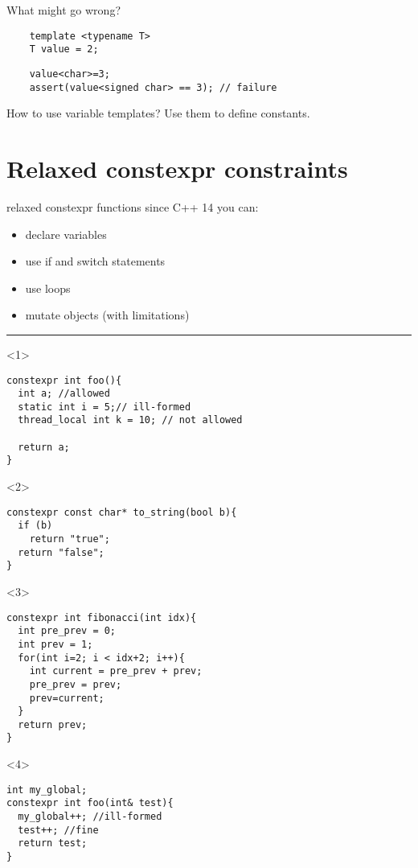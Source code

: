 \documentclass[10pt]{beamer}
\begin{document}
\begin{frame}[fragile]{What might go wrong?}
	\begin{verbatim}
	template <typename T>
	T value = 2;
	\end{verbatim}

	\pause

	\begin{verbatim}
	value<char>=3;
	assert(value<signed char> == 3); // failure
	\end{verbatim}
\end{frame}

\begin{frame}{How to use variable templates?}
\vfill
	\centering \alert{Use them to define constants.}
\vfill
\end{frame}


\section{Relaxed constexpr constraints}
\begin{frame}[fragile]{relaxed constexpr functions}
	since C++ 14 you can:
	\begin{itemize}[<+- |alert@+>]
		\item declare variables
		\item use if and switch statements
		\item use loops
		\item mutate objects (with limitations)
	\end{itemize}
	\hrule
	\vfill

	\begin{onlyenv}
	\begin{verbatim}
constexpr int foo(){
  int a; //allowed
  static int i = 5;// ill-formed
  thread_local int k = 10; // not allowed

  return a;
}
	\end{verbatim}
	\end{onlyenv}

	\begin{onlyenv}
	\begin{verbatim}
constexpr const char* to_string(bool b){
  if (b)
    return "true";
  return "false";
}
	\end{verbatim}
	\end{onlyenv}

	\begin{onlyenv}
	\begin{verbatim}
constexpr int fibonacci(int idx){
  int pre_prev = 0;
  int prev = 1;
  for(int i=2; i < idx+2; i++){
    int current = pre_prev + prev;
    pre_prev = prev;
    prev=current;
  }
  return prev;
}
	\end{verbatim}	
	\end{onlyenv}

	\begin{onlyenv}
	\begin{verbatim}
int my_global;	
constexpr int foo(int& test){
  my_global++; //ill-formed
  test++; //fine
  return test;
}
	\end{verbatim}	
	\end{onlyenv}

\end{frame}
\end{document}

